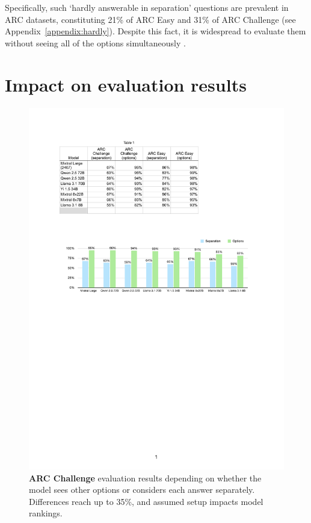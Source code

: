 \documentclass[11pt]{article}
\begin{document}
Specifically, such `hardly answerable in separation' questions are prevalent in ARC datasets, constituting 21\% of ARC Easy and 31\% of ARC Challenge (see Appendix~\ref{appendix:hardly}). %
Despite this fact, it is widespread to evaluate them without seeing all of the options simultaneously \cite[\textit{inter alia}]{touvron2023llamaopenefficientfoundation,touvron2023llama2openfoundation,jiang2023mistral7b,peng2023rwkvreinventingrnnstransformer,ai2024yiopenfoundationmodels,gemmateam2024gemmaopenmodelsbased}.

\section{Impact on evaluation results}\label{sec:impact}

\begin{figure}
    \centering
    \includegraphics[width=0.95\linewidth]{images/challenge.pdf}
    \caption{{\color{snownavy}\textbf{ARC Challenge}} evaluation results depending on whether the model sees other options or considers each answer separately. Differences reach up to 35\%, and assumed setup impacts model rankings.}
    \label{fig:challenge}
\end{figure}
\end{document}
